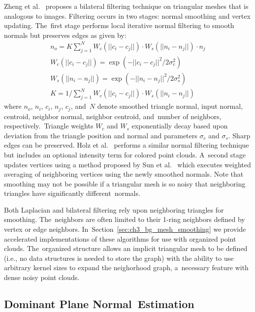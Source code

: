 Zheng et al.~\cite{zheng_bilateral_2011} proposes a bilateral filtering technique on triangular meshes that is analogous to images.   Filtering occurs in two stages: normal smoothing and vertex updating. The~first stage performs local iterative normal filtering to smooth normals but preserves edges as given by:
\begin{align}
  n_o = K \sum_{j=1}^{N} W_c(||c_i-c_j||) \cdot W_s(||n_i-n_j||) \cdot n_j \label{eq:ch3_bilateral} \\
  W_c(||c_i-c_j||) = \operatorname{exp}(-||c_i-c_j||^2/2\sigma_c^2 ) \label{eq:ch3_bilateral_centroid} \\
  W_s(||n_i-n_j||) = \operatorname{exp}(-||n_i-n_j||^2/2\sigma_s^2 ) \label{eq:ch3_bilateral_normal}\\
  K = 1 / \sum_{j=1}^{N} W_c(||c_i-c_j||) \cdot W_s(||n_i-n_j||)
\end{align}
where $n_o$, $n_i$, $c_i$, $n_j$, $c_j$, and~$N$ denote smoothed triangle normal, input normal, centroid, neighbor normal, neighbor centroid, and~number of neighbors, respectively.~Triangle weights $W_c$ and $W_s$ exponentially decay based upon deviation from the triangle position and normal and parameters $\sigma_c$ and $\sigma_s$. Sharp edges can be preserved. Holz et al.~\cite{lee_fast_2013} performs a similar normal filtering technique but includes an optional intensity term for colored point clouds. A~second stage updates vertices using a method proposed by Sun et al.~\cite{sun_fast_2007} which executes weighted averaging of neighboring vertices using the newly smoothed normals. Note that smoothing may not be possible if a triangular mesh is so noisy that neighboring triangles have significantly different~normals. 

Both Laplacian and bilateral filtering rely upon neighboring triangles for smoothing.  The~neighbors are often limited to their 1-ring neighbors defined by vertex or edge neighbors. In~Section~\ref{sec:ch3_bg_mesh_smoothing} we provide accelerated implementations of these algorithms for use with organized point clouds. The~organized structure allows an implicit triangular mesh to be defined (i.e., no data structures is needed to store the graph) with the ability to use arbitrary kernel sizes to expand the neighorhood graph, a~necessary feature with dense noisy point clouds. 


\subsection{Dominant Plane Normal~Estimation}\label{sec:ch3_bg_dominant_plane_normal}

